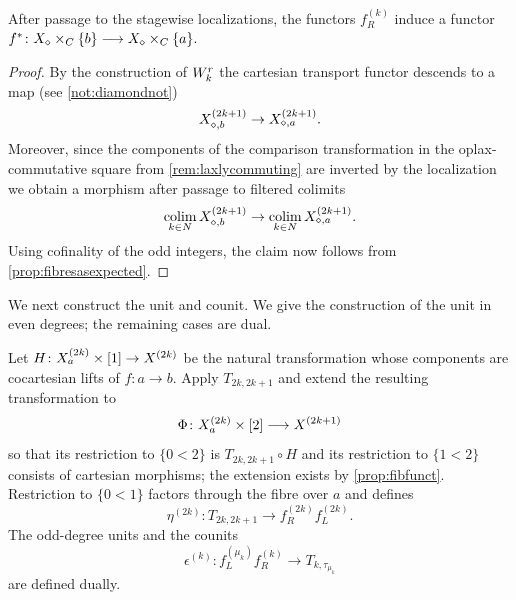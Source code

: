 \documentclass[a4paper,reqno,twoside]{amsart}
\begin{document}
\begin{proposition}\label{prop:f^*descends}
	After passage to the stagewise localizations, the functors $f_R^{(k)}$ induce a functor $f^*\colon\relax{X}_{\diamond}\times_{\relax{C}}\{b\}\longrightarrow\relax{X}_{\diamond}\times_{\relax{C}}\{a\}.$
\end{proposition}
\begin{proof}
    By the construction of $\relax{W}_{k}^{r}$ the cartesian transport functor descends to a map (see \cref{not:diamondnot})
	\[
		\relax{X}_{\diamond,b}^{(2k+1)} \to \relax{X}_{\diamond,a}^{(2k+1)}.
	\]
	Moreover, since the components of the comparison transformation in the oplax-commutative square from \cref{rem:laxlycommuting} are inverted by the localization we obtain a morphism after passage to  filtered colimits
	\[
		\operatorname*{colim}_{k \in \relax{N}}\relax{X}_{\diamond,b}^{(2k+1)} \to \operatorname*{colim}_{k \in \relax{N}}\relax{X}_{\diamond,a}^{(2k+1)}.
	\]
	Using cofinality of the odd integers, the claim now follows from \cref{prop:fibresasexpected}.
\end{proof}

We next construct the unit and counit. We give the construction of the unit in even degrees; the remaining cases are dual.

\begin{construction}\label{cons:eta}
	Let $H\colon\relax{X}_a^{(2k)}\times[1]\to\relax{X}^{(2k)}$ be the natural transformation whose components are cocartesian lifts of $f\colon a\to b$. Apply $T_{2k,2k+1}$ and extend the resulting transformation to
	\[
		\Phi\colon\relax{X}_a^{(2k)}\times[2]\longrightarrow\relax{X}^{(2k+1)}
	\]
	so that its restriction to $\{0<2\}$ is $T_{2k,2k+1}\circ H$ and its restriction to $\{1<2\}$ consists of cartesian morphisms; the extension exists by \cref{prop:fibfunct}. Restriction to $\{0<1\}$ factors through the fibre over $a$ and defines
	\[
		\eta^{(2k)}\colon
		T_{2k,2k+1}
		\longrightarrow
		f_R^{(2k)}f_L^{(2k)}.
	\]
	The odd-degree units and the counits
	\[
		\epsilon^{(k)}\colon
		f_L^{(\mu_k)}f_R^{(k)}\longrightarrow T_{k,\tau_{\mu_k}}
	\]
	are defined dually.
\end{construction}
\end{document}
